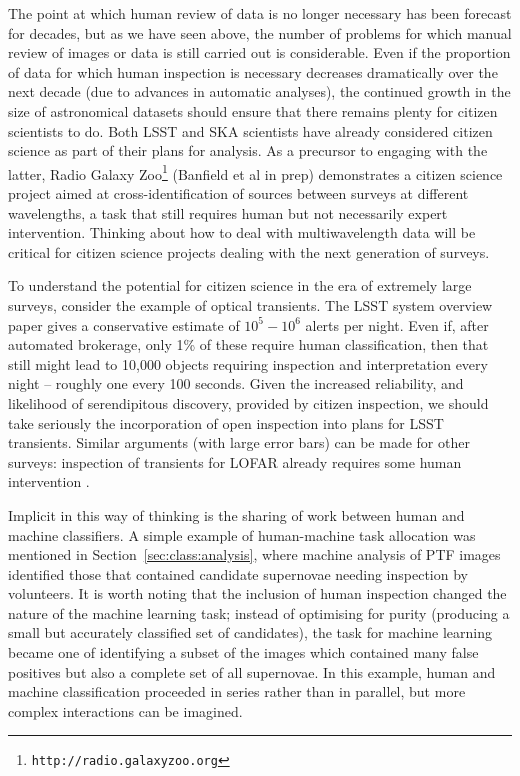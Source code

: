 \documentclass{ar2e}
\def\Sref#1{Section~\ref{#1}\xspace}
\def\url#1{\texttt{#1}}
\begin{document}
The point at which human review of data is no longer necessary has been forecast
for decades, but as we have seen above, the number of problems for which manual
review of images or data is still carried out is considerable. Even if the
proportion of data for which human inspection is necessary decreases
dramatically over the next decade (due to advances in automatic analyses), the
continued growth in the size of astronomical datasets should ensure that there
remains plenty for citizen scientists to do. Both LSST \citep{LSSTsystem} and SKA scientists \citep{Norris} 
have already considered citizen science as part of their plans for analysis. As a precursor to engaging
with the latter, Radio Galaxy Zoo\footnote{\url{http://radio.galaxyzoo.org}} (Banfield et al in prep) demonstrates
a citizen science project aimed at cross-identification of sources between surveys at different wavelengths, a
task that still requires human but not necessarily expert intervention. Thinking about how to deal with
multiwavelength data will be critical for citizen science projects dealing with the next generation of surveys. 

To understand the potential for citizen science in the era of extremely large surveys, consider the example of optical transients. The LSST system overview paper
\citep{LSSTsystem} gives a conservative estimate of $10^5-10^6$ alerts per
night. Even if, after automated brokerage, only 1\% of these require human
classification, then that still might lead to 10,000 objects requiring
inspection and interpretation every night -- roughly one every 100 seconds.
Given the increased reliability, and likelihood of serendipitous discovery,
provided by citizen inspection, we should take seriously the incorporation of
open inspection into plans for LSST transients. Similar arguments (with large
error bars) can be made for other surveys: inspection of transients for LOFAR
already requires some human intervention \citep{LOFAR}. 

Implicit in this way of thinking is the sharing of work between human and
machine classifiers.  A simple example of human-machine task allocation was
mentioned in \Sref{sec:class:analysis}, where machine analysis of PTF images
identified those that contained candidate supernovae needing inspection by
volunteers. It is worth noting that the inclusion of human inspection changed
the nature of the machine learning task; instead of optimising for purity
(producing a small but accurately classified set of candidates), the task for
machine learning became one of identifying a subset of the images which
contained many false positives but also a complete set of all supernovae. 
In this example, human and machine classification proceeded in series rather
than in parallel, but more complex interactions can be imagined. 
\end{document}
